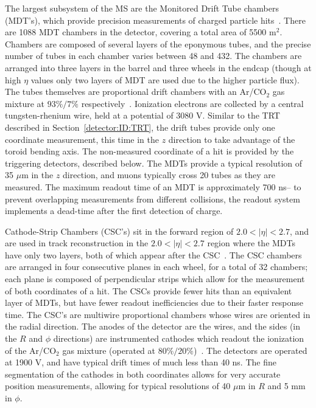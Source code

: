 
The largest subsystem of the MS are the Monitored Drift Tube chambers (MDT's), which provide precision measurements of charged particle hits~\cite{ATLASPaper}. There are 1088 MDT chambers in the detector, covering a total area of 5500 m$^2$. Chambers are composed of several layers of the eponymous tubes, and the precise number of tubes in each chamber varies between 48 and 432. The chambers are arranged into three layers in the barrel and three wheels in the endcap (though at high $\eta$ values only two layers of MDT are used due to the higher particle flux). The tubes themselves are proportional drift chambers with an Ar/CO$_2$ gas mixture at $93\%/7\%$ respectively~\cite{ATLASPaper,Detectors}. Ionization electrons are collected by a central tungsten-rhenium wire, held at a potential of 3080 V. Similar to the TRT described in Section~\ref{detector:ID:TRT}, the drift tubes provide only one coordinate measurement, this time in the $z$ direction to take advantage of the toroid bending axis. The non-measured coordinate of a hit is provided by the triggering detectors, described below. The MDTs provide a typical resolution of 35 $\mu$m in the $z$ direction, and muons typically cross 20 tubes as they are measured. The maximum readout time of an MDT is approximately 700 ns-- to prevent overlapping measurements from different collisions, the readout system implements a dead-time after the first detection of charge.
 
Cathode-Strip Chambers (CSC's) sit in the forward region of $2.0 < |\eta| < 2.7$, and are used in track reconstruction in the $2.0 < |\eta| < 2.7$ region where the MDTs have only two layers, both of which appear after the CSC~\cite{ATLASPaper}. The CSC chambers are arranged in four consecutive planes in each wheel, for a total of 32 chambers; each plane is composed of perpendicular strips which allow for the measurement of both coordinates of a hit. The CSCs provide fewer hits than an equivalent layer of MDTs, but have fewer readout inefficiencies due to their faster response time. The CSC's are multiwire proportional chambers whose wires are oriented in the radial direction. The anodes of the detector are the wires, and the sides (in the $R$ and $\phi$ directions) are instrumented cathodes which readout the ionization of the Ar/CO$_2$ gas mixture (operated at $80\%/20\%$)~\cite{Detectors,ATLASPaper}. The detectors are operated at 1900 V, and have typical drift times of much less than 40 ns. The fine segmentation of the cathodes in both coordinates allows for very accurate position measurements, allowing for typical resolutions of 40 $\mu$m in $R$ and 5 mm in $\phi$.

